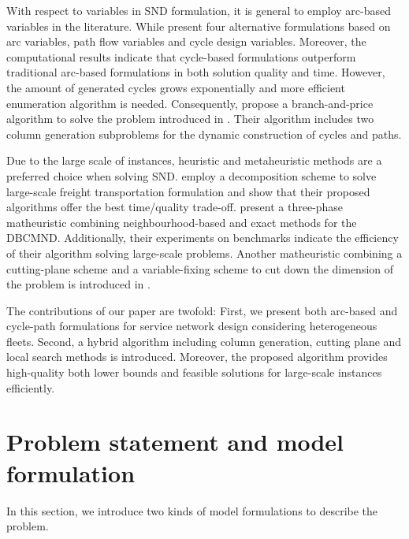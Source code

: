 \documentclass[11pt,nonblindrev,fleqn]{article}
\begin{document}
With respect to variables in SND formulation, it is general to employ arc-based variables in the literature. While \cite{Andersen2009bService} present four alternative formulations based on arc variables, path flow variables and cycle design variables. Moreover, the computational results indicate that cycle-based formulations outperform traditional arc-based formulations in both solution quality and time. However, the amount of generated cycles grows exponentially and more efficient enumeration algorithm is needed. Consequently, \cite{Andersen2011Branch} propose a branch-and-price algorithm to solve the problem introduced in \cite{Andersen2009aService}. Their algorithm includes two column generation subproblems for the dynamic construction of cycles and paths.

Due to the large scale of instances, heuristic and metaheuristic methods are a preferred choice when solving SND. \cite{Teypaz2010A} employ a decomposition scheme to solve large-scale freight transportation formulation and show that their proposed algorithms offer the best time/quality trade-off. \cite{VuDucToulouse} present a three-phase matheuristic combining neighbourhood-based and exact methods for the DBCMND. Additionally, their experiments on benchmarks indicate the efficiency of their algorithm solving large-scale problems. Another matheuristic combining a cutting-plane scheme and a variable-fixing scheme to cut down the dimension of the problem is introduced in \cite{Chouman2015Cutting}.

The contributions of our paper are twofold: First, we present both arc-based and cycle-path formulations for service network design considering heterogeneous fleets. Second, a hybrid algorithm including column generation, cutting plane and local search methods is introduced. Moreover, the proposed algorithm provides high-quality both lower bounds and feasible solutions for large-scale instances efficiently.

\section{Problem statement and model formulation}
In this section, we introduce two kinds of model formulations to describe the problem.
\end{document}
